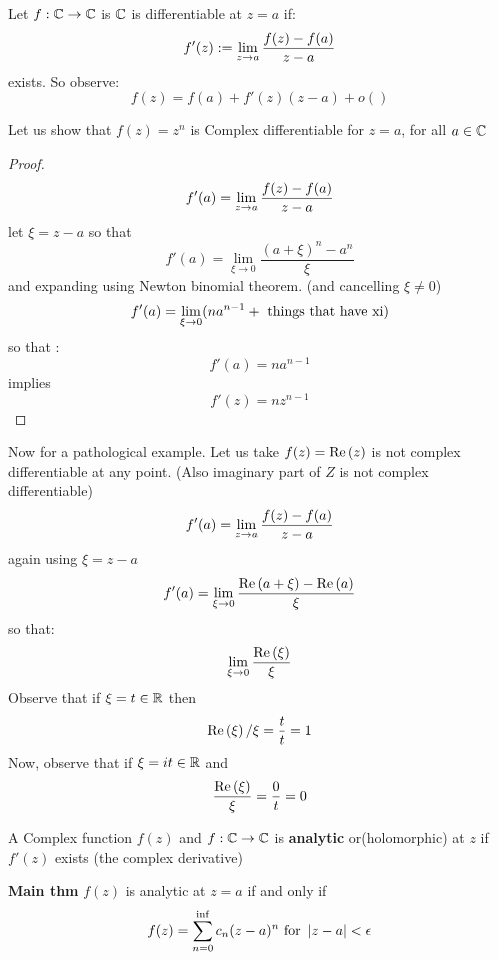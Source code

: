Let $f : \mathbb{C} \rightarrow \mathbb{C}$ is $\mathbb{C}$ is differentiable at $ z =a$ if:
\[ f'(z) := \lim\limits_{z \rightarrow a} \frac{f(z) - f(a)}{z-a} \]
exists.
So observe:
\[ f(z) = f(a) + f'(z)(z-a) + o() \]
\begin{prop}
	Let us show that $f(z) = z^n$ is Complex differentiable for $ z =a $, for all $ a\in \mathbb{C}$
\end{prop}
\begin{proof}
	\[ f'(a) = \lim\limits_{z \rightarrow a} \frac{f(z) - f(a)}{z-a} \]
	let $ \xi = z -a $
	so that
	\[ f'(a) = \lim\limits_{ \xi \rightarrow 0}  \frac{(a + \xi)^n - a^n}{\xi}\]
	and expanding using Newton binomial theorem. (and cancelling $ \xi \neq 0 $)
	\[ f'(a) = \lim\limits_{\xi \rightarrow 0} (n a^{n-1} + \textrm{ things that have xi}) \]
	so that :
	\[ f'(a) = na^{n-1} \]
	implies 
	\[ f'(z) = n z^{n-1} \]
\end{proof}
Now for a pathological example. Let us take $ f(z) = \mathrm{Re} \left( z \right) $ is not complex differentiable at any point. (Also imaginary part of $Z$ is not complex differentiable)
\[ f'(a) = \lim\limits_{z \rightarrow a} \frac{f(z) - f(a)}{z-a}  \]
again using $ \xi = z-a$
\[ f'(a) = \lim\limits_{ \xi  \rightarrow 0} \frac{\mathrm{Re} \left( a + \xi \right) - \mathrm{Re} \left( a \right)}{\xi} \]
so that:
\[ \lim\limits_{\xi \rightarrow 0} \frac{\mathrm{Re} \left( \xi \right)}{\xi} \]
Observe that if $ \xi = t \in \mathbb{R} $ then 
\[ \mathrm{Re} \left( \xi \right) / \xi = \frac{t}{t}  = 1\]
Now, observe that if $ \xi = it \in \mathbb{R}$ and 
\[ \frac{\mathrm{Re} \left( \xi \right)}{\xi} = \frac{0}{t}= 0\]
\begin{define}
	A Complex function $f(z)$ and $f : \mathbb{C} \rightarrow \mathbb{C}$ is \textbf{analytic } or(holomorphic) at $z$ if $ f'(z) $ exists (the complex derivative)
\end{define}
\begin{thm}
	\textbf{Main thm} $f(z) $ is analytic at $ z =a $ if and only if 
	\[ f(z) = \sum_{n=0}^{\inf} c_n (z-a)^n \textrm{ for } \left| z-a \right| < \epsilon\]
\end{thm}
